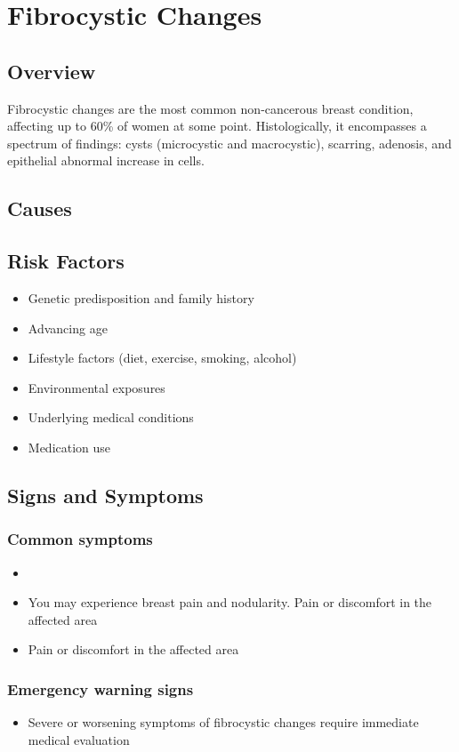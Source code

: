 \chapter{Fibrocystic Changes}
\label{sec:Fibrocystic Changes}

\section{Overview}
Fibrocystic changes are the most common non-cancerous breast condition, affecting up to 60\% of women at some point. Histologically, it encompasses a spectrum of findings: cysts (microcystic and macrocystic), scarring, adenosis, and epithelial abnormal increase in cells.
\section{Causes}
\section{Risk Factors}

\begin{itemize}[noitemsep]
  \item Genetic predisposition and family history
  \item Advancing age
  \item Lifestyle factors (diet, exercise, smoking, alcohol)
  \item Environmental exposures
  \item Underlying medical conditions
  \item Medication use
\end{itemize}
\section{Signs and Symptoms}

\subsection{Common symptoms}
\begin{itemize}[noitemsep]
  \item \item You may experience breast pain and nodularity. Pain or discomfort in the affected area    \item Pain or discomfort in the affected area
  \end{itemize}

\subsection{Emergency warning signs}
\begin{itemize}[noitemsep]
  \item Severe or worsening symptoms of fibrocystic changes require immediate medical evaluation
\end{itemize}
